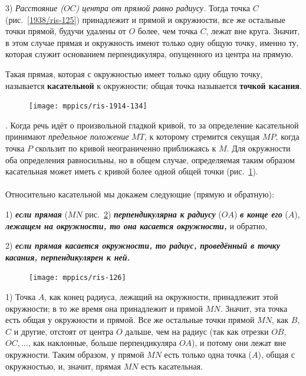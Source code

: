 \documentclass[twoside]{book}
\makeatletter
\newcommand{\rindex}[2][\imki@jobname]{%
  \index[#1]{\detokenize{#2}}%
}
\makeatother
\begin{document}
3) \emph{Расстояние \emph{($OC$)} центра от прямой равно радиусу.}
Тогда точка $C$ (рис.~\ref{1938/ris-125}) принадлежит и прямой и окружности, все же остальные точки прямой, будучи удалены от $O$ более, чем точка $C$, лежат вне круга.
Значит, в этом случае прямая и окружность имеют только одну общую точку, именно ту, которая служит основанием перпендикуляра, опущенного из центра на прямую.

Такая прямая, которая с окружностью имеет только одну общую точку, называется \rindex{касательная}\textbf{касательной} к окружности;
общая точка называется \rindex{точка касания}\textbf{точкой касания}.

\begin{figure}
\centering
\texttt{[image: mppics/ris-1914-134]}
\caption{}\label{1914/ris-134}
\end{figure}

\medskip

\smallskip
\mbox{.}
Когда речь идёт о произвольной гладкой кривой, то за определение касательной принимают \emph{предельное положение} $MT$, к которому стремится секущая $MP$, когда точка $P$ скользит по кривой неограниченно приближаясь к $M$.
Для окружности оба определения равносильны, но в общем случае, определяемая таким образом касательная может иметь с кривой более одной общей точки (рис.~\ref{1914/ris-134}).%

\paragraph{}\label{1938/113}
Относительно касательной мы докажем следующие  (прямую и обратную):

1) \textbf{\emph{если прямая}} ($MN$ рис.~\ref{1938/ris-126}) \textbf{\emph{перпендикулярна к радиусу}} ($OA$) \textbf{\emph{в конце его}} ($A$), \textbf{\emph{лежащем на окружности, то она касается окружности,}} и обратно,

2) \textbf{\emph{если прямая касается окружности, то радиус, проведённый в точку касания, перпендикулярен к ней.}}

\begin{figure}
\centering
\texttt{[image: mppics/ris-126]}
\caption{}\label{1938/ris-126}
\end{figure}

1) Точка $A$, как конец радиуса, лежащий на окружности, принадлежит этой окружности;
в то же время она принадлежит и прямой $MN$.
Значит, эта точка есть общая у окружности и прямой.
Все же остальные точки прямой $MN$, как $B$, $C$ и другие, отстоят от центра $O$ дальше, чем на радиус (так как отрезки $OB$, $OC,\dots$, как наклонные, больше перпендикуляра $OA$), и потому они лежат вне окружности.
Таким образом, у прямой $MN$ есть только одна точка ($A$), общая с окружностью, и, значит, прямая $MN$ есть касательная.
\end{document}
